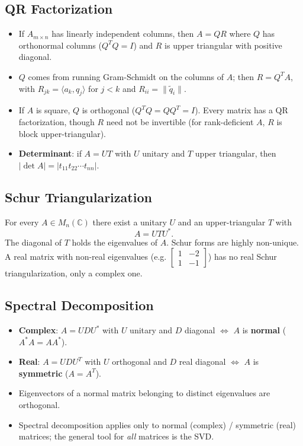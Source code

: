 \documentclass[hidelinks]{article}
\begin{document}
\subsection{QR Factorization}
\begin{itemize}
    \item If $A_{m\times n}$ has linearly independent columns, then $A = QR$ where $Q$ has orthonormal columns ($Q^TQ = I$) and $R$ is upper triangular with positive diagonal.
    \item $Q$ comes from running Gram-Schmidt on the columns of $A$; then $R = Q^TA$, with $R_{jk} = \langle a_k, q_j\rangle$ for $j<k$ and $R_{ii} = \|\tilde q_i\|$.
    \item If $A$ is square, $Q$ is orthogonal ($Q^TQ = QQ^T = I$). Every matrix has a QR factorization, though $R$ need not be invertible (for rank-deficient $A$, $R$ is block upper-triangular).
    \item \textbf{Determinant}: if $A = UT$ with $U$ unitary and $T$ upper triangular, then $|\det A| = |t_{11}t_{22}\cdots t_{nn}|$.
\end{itemize}

\subsection{Schur Triangularization}
For every $A\in M_n(\mathbb{C})$ there exist a unitary $U$ and an upper-triangular $T$ with
\[
    A = UTU^{*}.
\]
The diagonal of $T$ holds the eigenvalues of $A$. Schur forms are highly non-unique. A real matrix with non-real eigenvalues (e.g. $\begin{bmatrix}1&-2\\1&-1\end{bmatrix}$) has no real Schur triangularization, only a complex one.

\subsection{Spectral Decomposition}
\begin{itemize}
    \item \textbf{Complex}: $A = UDU^{*}$ with $U$ unitary and $D$ diagonal $\iff$ $A$ is \textbf{normal} ($A^{*}A = AA^{*}$).
    \item \textbf{Real}: $A = UDU^{T}$ with $U$ orthogonal and $D$ real diagonal $\iff$ $A$ is \textbf{symmetric} ($A = A^T$).
    \item Eigenvectors of a normal matrix belonging to distinct eigenvalues are orthogonal.
    \item Spectral decomposition applies only to normal (complex) / symmetric (real) matrices; the general tool for \emph{all} matrices is the SVD.
\end{itemize}
\end{document}
